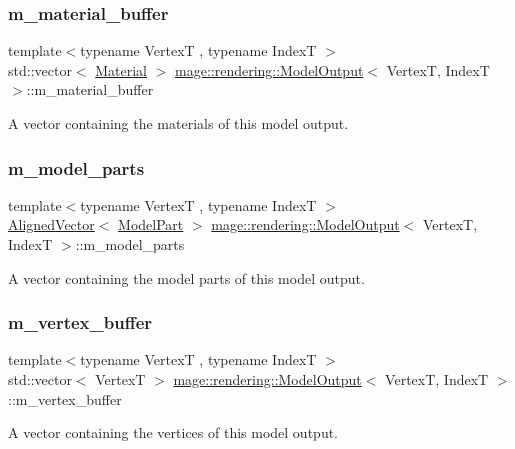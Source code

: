 \subsubsection{\texorpdfstring{m\+\_\+material\+\_\+buffer}{m\_material\_buffer}}
{\footnotesize\ttfamily template$<$typename VertexT , typename IndexT $>$ \\
std\+::vector$<$ \mbox{\hyperlink{classmage_1_1rendering_1_1_material}{Material}} $>$ \mbox{\hyperlink{structmage_1_1rendering_1_1_model_output}{mage\+::rendering\+::\+Model\+Output}}$<$ VertexT, IndexT $>$\+::m\+\_\+material\+\_\+buffer}

A vector containing the materials of this model output. \mbox{\label{structmage_1_1rendering_1_1_model_output_a18da9c959800d0331488351612e25df2}} 
\subsubsection{\texorpdfstring{m\+\_\+model\+\_\+parts}{m\_model\_parts}}
{\footnotesize\ttfamily template$<$typename VertexT , typename IndexT $>$ \\
\mbox{\hyperlink{namespacemage_a8664bfb5ce2179fc64eae9f82c8a5ba8}{Aligned\+Vector}}$<$ \mbox{\hyperlink{structmage_1_1rendering_1_1_model_part}{Model\+Part}} $>$ \mbox{\hyperlink{structmage_1_1rendering_1_1_model_output}{mage\+::rendering\+::\+Model\+Output}}$<$ VertexT, IndexT $>$\+::m\+\_\+model\+\_\+parts}

A vector containing the model parts of this model output. \mbox{\label{structmage_1_1rendering_1_1_model_output_a397e9daee731bb89683daa68bd4acd0f}} 
\subsubsection{\texorpdfstring{m\+\_\+vertex\+\_\+buffer}{m\_vertex\_buffer}}
{\footnotesize\ttfamily template$<$typename VertexT , typename IndexT $>$ \\
std\+::vector$<$ VertexT $>$ \mbox{\hyperlink{structmage_1_1rendering_1_1_model_output}{mage\+::rendering\+::\+Model\+Output}}$<$ VertexT, IndexT $>$\+::m\+\_\+vertex\+\_\+buffer}

A vector containing the vertices of this model output. 